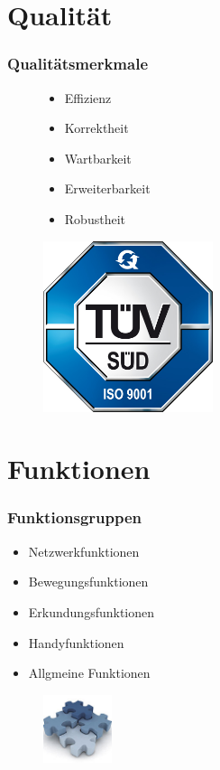 \documentclass{beamer}
\begin{document}
\begin{frame}
		
		 
\end{frame}

\section{Qualität}
\begin{frame}
  \frametitle{Qualitätsmerkmale}
	\begin{figure}[htbp]
	
	\begin{minipage}[t]{0.5\textwidth}
		\begin{itemize}
			\item Effizienz
			\item Korrektheit
			\item Wartbarkeit
			\item Erweiterbarkeit
			\item Robustheit
		\end{itemize}
	\end{minipage}
	\hfill
	\begin{minipage}[t]{5cm}
		\vspace{0pt}
		\includegraphics[height=5cm]{qualitt.jpg} 
	\end{minipage}
   \end{figure}  	  
  
\end{frame}

\section{Funktionen}
\begin{frame}
  \frametitle{Funktionsgruppen}
  
  	\begin{itemize}
		\item Netzwerkfunktionen
		\item Bewegungsfunktionen
		\item Erkundungsfunktionen
		\item Handyfunktionen
		\item Allgmeine Funktionen
	\end{itemize}  
	\begin{figure}[bp]
		\includegraphics[height=2cm]{funktional.jpg} 
	\end{figure}
	
\end{frame}
\end{document}
